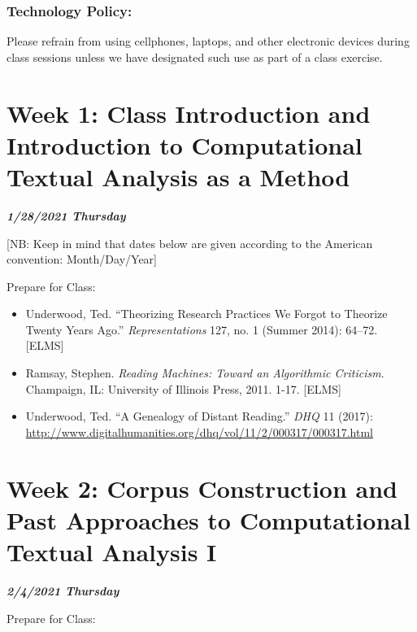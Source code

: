 \documentclass[
]{book}
\providecommand{\tightlist}{%
  \setlength{\itemsep}{0pt}\setlength{\parskip}{0pt}}
\begin{document}
\hypertarget{technology-policy}{%
\subsection{Technology Policy:}\label{technology-policy}}

Please refrain from using cellphones, laptops, and other electronic devices during class sessions unless we have designated such use as part of a class exercise.

\hypertarget{week-1-class-introduction-and-introduction-to-computational-textual-analysis-as-a-method-1}{%
\chapter{Week 1: Class Introduction and Introduction to Computational Textual Analysis as a Method}\label{week-1-class-introduction-and-introduction-to-computational-textual-analysis-as-a-method-1}}

\textbf{\emph{1/28/2021 Thursday}}

{[}NB: Keep in mind that dates below are given according to the American convention: Month/Day/Year{]}

Prepare for Class:

\begin{itemize}
\tightlist
\item
  Underwood, Ted. ``Theorizing Research Practices We Forgot to Theorize Twenty Years Ago.'' \emph{Representations} 127, no. 1 (Summer 2014): 64--72. {[}ELMS{]}
\item
  Ramsay, Stephen. \emph{Reading Machines: Toward an Algorithmic Criticism}. Champaign, IL: University of Illinois Press, 2011. 1-17. {[}ELMS{]}
\item
  Underwood, Ted. ``A Genealogy of Distant Reading.'' \emph{DHQ} 11 (2017): \url{http://www.digitalhumanities.org/dhq/vol/11/2/000317/000317.html}
\end{itemize}

\hypertarget{week-2-corpus-construction-and-past-approaches-to-computational-textual-analysis-i-1}{%
\chapter{Week 2: Corpus Construction and Past Approaches to Computational Textual Analysis I}\label{week-2-corpus-construction-and-past-approaches-to-computational-textual-analysis-i-1}}

\textbf{\emph{2/4/2021 Thursday}}

Prepare for Class:
\end{document}
